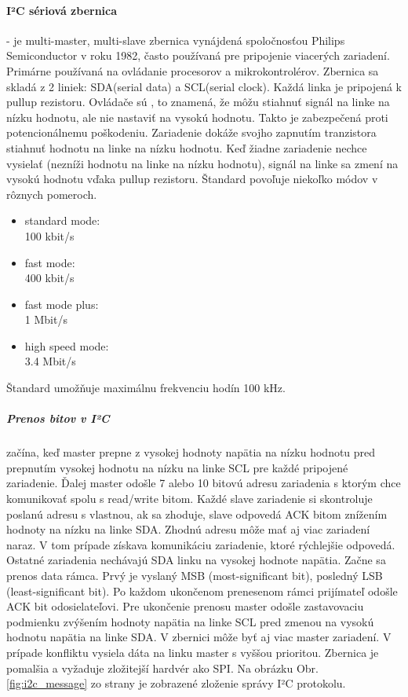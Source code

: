 \documentclass[../../main.tex]{subfiles}
\begin{document}
\paragraph{I²C sériová zbernica}  - je multi-master, multi-slave zbernica vynájdená spoločnosťou Philips Semiconductor v roku 1982, často používaná pre pripojenie viacerých zariadení. Primárne používaná na ovládanie procesorov a mikrokontrolérov. Zbernica sa skladá z 2 liniek: SDA(serial data) a SCL(serial clock). Každá linka je pripojená k pullup rezistoru. Ovládače sú , to znamená, že môžu stiahnuť signál na linke na nízku hodnotu, ale nie nastaviť na vysokú hodnotu. Takto je zabezpečená proti potencionálnemu poškodeniu\cite{sparkfun}. Zariadenie dokáže svojho zapnutím tranzistora stiahnuť hodnotu na linke na nízku hodnotu. Keď žiadne zariadenie nechce vysielať (nezníži hodnotu na linke na nízku hodnotu), signál na linke sa zmení na vysokú hodnotu vďaka pullup rezistoru. Štandard povoľuje niekoľko módov v rôznych pomeroch.\cite{WOLF201923}
\begin{multicols}{4}
    \begin{itemize}
        \item standard mode:\\ 100 kbit/s
        \item fast mode:\\ 400 kbit/s
        \item fast mode plus:\\  1 Mbit/s
        \item high speed mode:\\ 3.4 Mbit/s
    \end{itemize}
\end{multicols}
Štandard umožňuje maximálnu frekvenciu hodín 100 kHz.
\subparagraph{Prenos bitov v I²C} začína, keď master prepne z vysokej hodnoty napätia na nízku hodnotu pred prepnutím vysokej hodnotu na nízku na linke SCL pre každé pripojené zariadenie.
Ďalej master odošle 7 alebo 10 bitovú adresu zariadenia s ktorým chce komunikovať spolu s read/write bitom. Každé slave zariadenie si skontroluje poslanú adresu s vlastnou, ak sa zhoduje, slave odpovedá ACK bitom znížením hodnoty na nízku na linke SDA. Zhodnú adresu môže mať aj viac zariadení naraz. V tom prípade získava komunikáciu zariadenie, ktoré rýchlejšie odpovedá\cite{i2c_protocol}. Ostatné zariadenia nechávajú  SDA linku na vysokej hodnote napätia. Začne sa prenos data rámca. Prvý je vyslaný MSB (most-significant bit), posledný LSB (least-significant bit). Po každom ukončenom prenesenom rámci prijímateľ odošle ACK bit odosielateľovi. Pre ukončenie prenosu master odošle zastavovaciu podmienku zvýšením hodnoty napätia na linke SCL pred zmenou na vysokú hodnotu napätia na linke SDA.
\pageref{fig:i2c_message}
V zbernici môže byť aj viac master zariadení. V prípade konfliktu vysiela dáta na linku master s vyššou prioritou\cite{WOLF201923}. Zbernica je pomalšia a vyžaduje zložitejší hardvér ako SPI.\cite{i2c_protocol}
Na obrázku Obr. \ref{fig:i2c_message} zo strany \pageref{fig:i2c_message} je zobrazené zloženie správy I²C protokolu.
\end{document}

